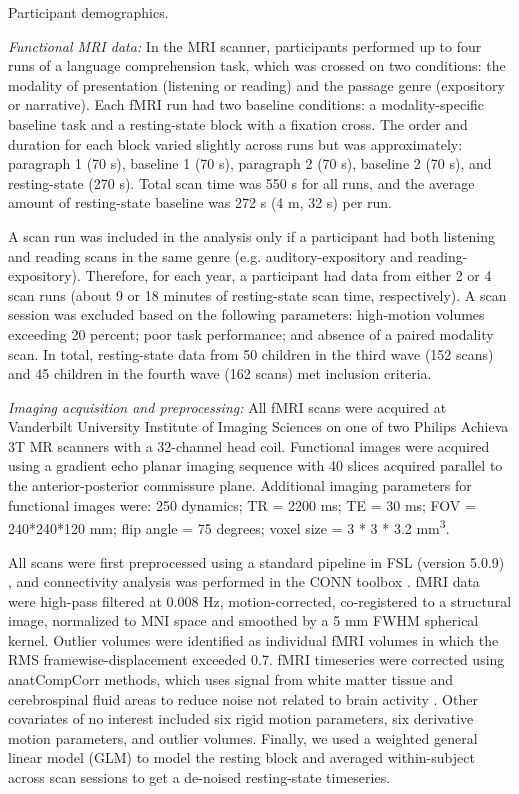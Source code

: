 \begin{table}
    \renewcommand{\tabcolsep}{0.09cm}
    \centering
    
    \caption{Participant demographics.}
    \label{table:ch2-participants}
\end{table}



\emph{Functional MRI data:} In the MRI scanner, participants performed up to four runs of a language comprehension task, which was crossed on two conditions: the modality of presentation (listening or reading) and the passage genre (expository or narrative).  Each fMRI run had two baseline conditions: a modality-specific baseline task and a resting-state block with a fixation cross. The order and duration for each block varied slightly across runs but was approximately: paragraph 1 (70 s), baseline 1 (70 s), paragraph 2 (70 s), baseline 2 (70 s), and resting-state (270 s). Total scan time was 550 s for all runs, and the average amount of resting-state baseline was 272 s (4 m, 32 s) per run.

A scan run was included in the analysis only if a participant had both listening and reading scans in the same genre (e.g. auditory-expository and reading-expository). Therefore, for each year, a participant had data from either 2 or 4 scan runs (about 9 or 18 minutes of resting-state scan time, respectively). A scan session was excluded based on the following parameters: high-motion volumes exceeding 20 percent; poor task performance; and absence of a paired modality scan. In total, resting-state data from 50 children in the third wave (152 scans) and 45 children in the fourth wave (162 scans) met inclusion criteria. 

\emph{Imaging acquisition and preprocessing: } All fMRI scans were acquired at Vanderbilt University Institute of Imaging Sciences on one of two Philips Achieva 3T MR scanners with a 32-channel head coil. Functional images were acquired using a gradient echo planar imaging sequence with 40 slices acquired parallel to the anterior-posterior commissure plane. Additional imaging parameters for functional images were: 250 dynamics; TR = 2200 ms; TE = 30 ms; FOV = 240*240*120 mm; flip angle = 75 degrees; voxel size = 3 * 3 * 3.2 mm\textsuperscript{3}.

All scans were first preprocessed using a standard pipeline in FSL (version 5.0.9) \citep{Jenkinson2012}, and connectivity analysis was performed in the CONN toolbox \citep{WhitfieldGabrieli2012}. fMRI data were high-pass filtered at 0.008 Hz, motion-corrected, co-registered to a structural image, normalized to MNI space and smoothed by a 5 mm FWHM spherical kernel. Outlier volumes were identified as individual fMRI volumes in which the RMS framewise-displacement exceeded 0.7. fMRI timeseries were corrected using anatCompCorr methods, which uses signal from white matter tissue and cerebrospinal fluid areas to reduce noise not related to brain activity \citep{Chai2012}. Other covariates of no interest included six rigid motion parameters, six derivative motion parameters, and outlier volumes. Finally, we used a weighted general linear model (GLM) to model the resting block and averaged within-subject across scan sessions to get a de-noised resting-state timeseries.


